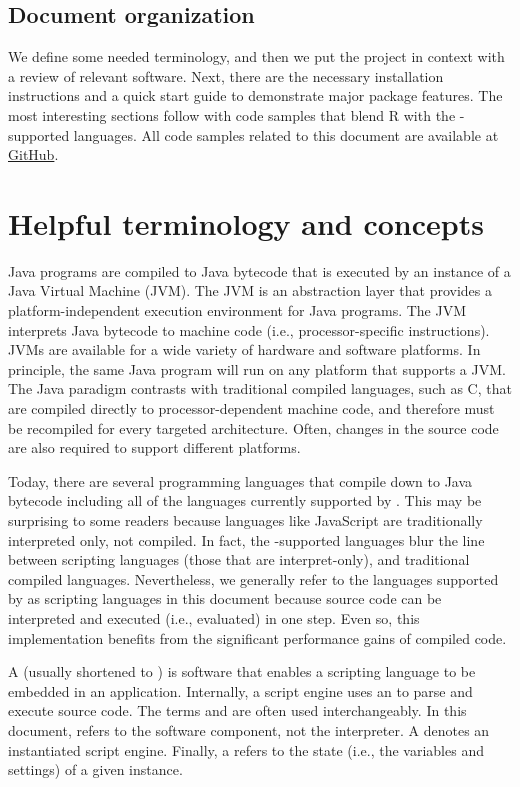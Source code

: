 \subsection{Document organization}

We define some needed terminology, and then we put the  project in context with a review of relevant software. Next, there are the necessary installation instructions and a quick start guide to demonstrate major package features. The most interesting sections follow with code samples that blend R with the -supported languages. All code samples related to this document are available at \href{http://notavalidaddresss////}{GitHub}.

\section{Helpful terminology and concepts}

Java programs are compiled to Java bytecode that is executed by an instance of a Java Virtual Machine (JVM). The JVM is an abstraction layer that provides a platform-independent execution environment for Java programs. The JVM interprets Java bytecode to machine code (i.e., processor-specific instructions). JVMs are available for a wide variety of hardware and software platforms. In principle, the same Java program will run on any platform that supports a JVM. The Java paradigm contrasts with traditional compiled languages, such as C, that are compiled directly to processor-dependent machine code, and therefore must be recompiled for every targeted architecture. Often, changes in the source code are also required to support different platforms.

Today, there are several programming languages that compile down to Java bytecode including all of the languages currently supported by . This may be surprising to some readers because languages like JavaScript are traditionally interpreted only, not compiled. In fact, the -supported languages blur the line between scripting languages (those that are interpret-only), and traditional compiled languages. Nevertheless, we generally refer to the languages supported by  as scripting languages in this document because source code can be interpreted and executed (i.e., evaluated) in one step. Even so, this implementation benefits from the significant performance gains of compiled code.

A  (usually shortened to ) is software that enables a scripting language to be embedded in an application. Internally, a script engine uses an  to parse and execute source code. The terms  and  are often used interchangeably. In this document,  refers to the software component, not the interpreter. A  denotes an instantiated script engine. Finally, a  refers to the state (i.e., the variables and settings) of a given instance.

